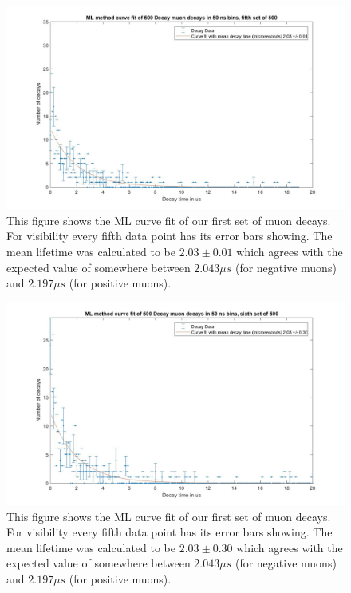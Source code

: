 \documentclass{article}
\begin{document}
\begin{figure}[H]
\includegraphics[scale=0.4,center]{ML_Curve_Fit_500e.jpg}
\caption{This figure shows the ML curve fit of our first set of muon decays.  For visibility every fifth data point has its error bars showing.  The mean lifetime was calculated to be $2.03 \pm 0.01$ which agrees with the expected value of somewhere between $2.043 \mu s$ (for negative muons) and $2.197 \mu s$ (for positive muons).}
\end{figure}

\begin{figure}[H]
\includegraphics[scale=0.4,center]{ML_Curve_Fit_500f.jpg}
\caption{This figure shows the ML curve fit of our first set of muon decays.  For visibility every fifth data point has its error bars showing.  The mean lifetime was calculated to be $2.03 \pm 0.30$ which agrees with the expected value of somewhere between $2.043 \mu s$ (for negative muons) and $2.197 \mu s$ (for positive muons).}
\end{figure}
\end{document}
